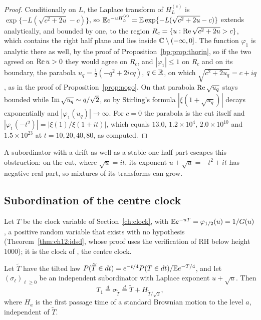 \begin{proof}
Conditionally on $L$, the Laplace transform of $H^{(c)}_L$ is $\exp\{-L(\sqrt{c^2+2u}-c)\}$, so $\mathbb{E} e^{-uH^{(c)}_L}=\mathbb{E}\exp\{-L(\sqrt{c^2+2u}-c)\}$ extends analytically, and bounded by one, to the region $R_c=\{u:\operatorname{Re}\sqrt{c^2+2u}>c\}$, which contains the right half plane and lies inside $\mathbb{C}\setminus(-\infty,0]$. The function $\varphi_1$ is analytic there as well, by the proof of Proposition~\ref{bp:prop:thorin}, so if the two agreed on $\operatorname{Re} u>0$ they would agree on $R_c$, and $|\varphi_1|\le1$ on $R_c$ and on its boundary, the parabola $u_q=\frac12(-q^2+2icq)$, $q\in\mathbb{R}$, on which $\sqrt{c^2+2u_q}=c+iq$, as in the proof of Proposition~\ref{prop:nogo}. On that parabola $\operatorname{Re}\sqrt{u_q}$ stays bounded while $\operatorname{Im}\sqrt{u_q}\sim q/\sqrt2$, so by Stirling's formula $|\xi(1+\sqrt{u_q})|$ decays exponentially and $|\varphi_1(u_q)|\to\infty$. For $c=0$ the parabola is the cut itself and $|\varphi_1(-t^2)|=|\xi(1)/\xi(1+it)|$, which equals $13.0$, $1.2\times10^4$, $2.0\times10^{10}$ and $1.5\times10^{23}$ at $t=10,20,40,80$, as computed.
\end{proof}

A subordinator with a drift as well as a stable one half part escapes this obstruction: on the cut, where $\sqrt u=it$, its exponent $u+\sqrt u=-t^2+it$ has negative real part, so mixtures of its transforms can grow.

\subsection{Subordination of the centre clock}\label{bp:sec:sub}

Let $T$ be the clock variable of Section~\ref{ch:clock}, with $\mathbb{E} e^{-uT}=\varphi_{1/2}(u)=1/G(u)$, a positive random variable that exists with no hypothesis (Theorem~\ref{thm:ch12:idsd}, whose proof uses the verification of RH below height $1000$); it is the clock of \cite{P17}, the centre clock.

\begin{theorem}\label{bp:thm:sub}
Let $\widetilde T$ have the tilted law $P(\widetilde T\in dt)=e^{-t/4}P(T\in dt)/\mathbb{E} e^{-T/4}$, and let $(\sigma_\ell)_{\ell\ge0}$ be an independent subordinator with Laplace exponent $u+\sqrt u$. Then
\[
T_1\stackrel{d}{=}\sigma_{\widetilde T}\stackrel{d}{=}\widetilde T+H_{\widetilde T/\sqrt2},
\]
where $H_a$ is the first passage time of a standard Brownian motion to the level $a$, independent of $\widetilde T$.
\end{theorem}

